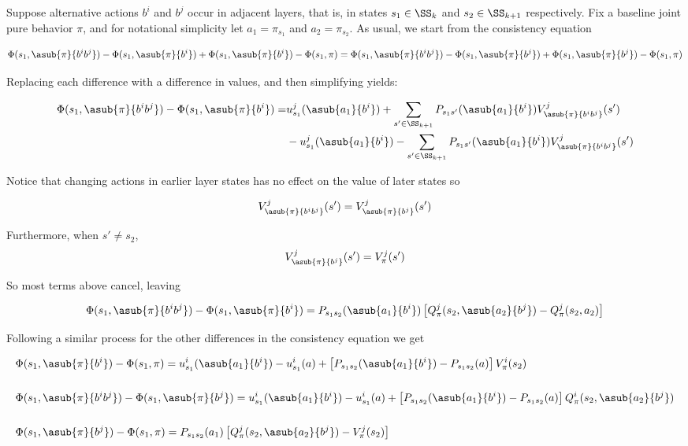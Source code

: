 Suppose alternative actions $b^i$ and $b^j$ occur in adjacent layers, that is, in states $s_1 \in \SS_k$ and $s_2 \in \SS_{k+1}$ respectively. Fix a baseline joint pure behavior $\pi$, and for notational simplicity let $a_1 = \pi_{s_1}$ and $a_2 = \pi_{s_2}$. As usual, we start from the consistency equation

$$
\Phi(s_1,\asub{\pi}{b^ib^j}) - \Phi(s_1,\asub{\pi}{b^i}) + \Phi(s_1,\asub{\pi}{b^i}) -
\Phi(s_1,\pi)
=
\Phi(s_1,\asub{\pi}{b^ib^j}) - \Phi(s_1,\asub{\pi}{b^j}) + \Phi(s_1,\asub{\pi}{b^j}) -
\Phi(s_1,\pi)
$$

Replacing each difference with a difference in values, and then simplifying yields:

\begin{align*}
\Phi(s_1,\asub{\pi}{b^ib^j}) - \Phi(s_1,\asub{\pi}{b^i}) = & u^j_{s_1}(\asub{a_1}{b^i}) + \sum_{s' \in \SS_{k+1}} P_{s_1s'}(\asub{a_1}{b^i})V^j_{\asub{\pi}{b^ib^j}}(s') \\
& - u^j_{s_1}(\asub{a_1}{b^i}) - \sum_{s' \in \SS_{k+1}} P_{s_1s'}(\asub{a_1}{b^i})V^j_{\asub{\pi}{b^ib^j}}(s')
\end{align*}

Notice that changing actions in earlier layer states has no effect on the value of later states so 

$$
V^j_{\asub{\pi}{b^ib^j}}(s') = V^j_{\asub{\pi}{b^j}}(s')
$$

Furthermore, when $s' \neq s_2$, 
$$
V^j_{\asub{\pi}{b^j}}(s') = V^j_{\pi}(s')
$$

So most terms above cancel, leaving

$$
\Phi(s_1,\asub{\pi}{b^ib^j}) - \Phi(s_1,\asub{\pi}{b^i}) = P_{s_1s_2}(\asub{a_1}{b^i}) \left[Q^j_{\pi}(s_2, \asub{a_2}{b^j}) - Q^j_{\pi}(s_2, a_2)\right]
$$

Following a similar process for the other differences in the consistency equation we get

\begin{align*}
&\Phi(s_1,\asub{\pi}{b^i}) - \Phi(s_1,\pi) = u^i_{s_1}(\asub{a_1}{b^i}) - u^i_{s_1}(a) + \left[P_{s_1s_2}(\asub{a_1}{b^i}) - P_{s_1s_2}(a)\right] V^i_{\pi}(s_2) \\
&\\
&\Phi(s_1,\asub{\pi}{b^ib^j}) - \Phi(s_1,\asub{\pi}{b^j}) = u^i_{s_1}(\asub{a_1}{b^i}) - u^i_{s_1}(a) + \left[P_{s_1s_2}(\asub{a_1}{b^i}) - P_{s_1s_2}(a)\right] Q^i_{\pi}(s_2, \asub{a_2}{b^j})\\
&\\
&\Phi(s_1,\asub{\pi}{b^j}) - \Phi(s_1,\pi) = P_{s_1s_2}(a_1) \left[Q^j_{\pi}(s_2, \asub{a_2}{b^j}) - V^j_{\pi}(s_2)\right]
\end{align*}


